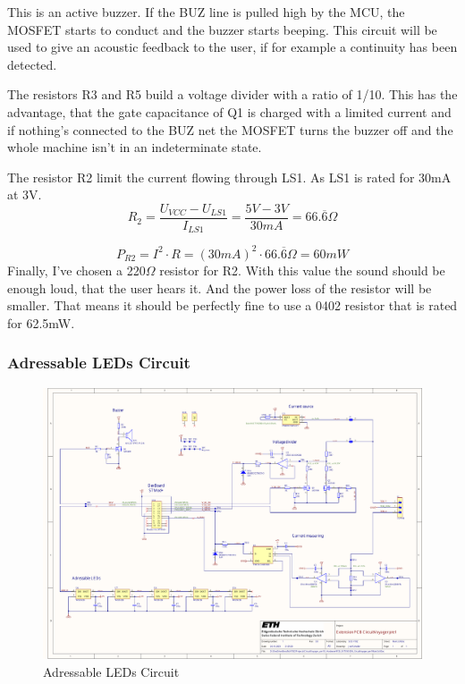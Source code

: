 This is an active buzzer. If the BUZ line is pulled high by the MCU, the MOSFET starts to conduct and the buzzer starts beeping. This circuit will be used to give an acoustic feedback to the user, if for example a continuity has been detected. 

The resistors R3 and R5 build a voltage divider with a ratio of 1/10. This has the advantage, that the gate capacitance of Q1 is charged with a limited current and if nothing's connected to the BUZ net the MOSFET turns the buzzer off and the whole machine isn't  in an indeterminate state.

The resistor R2 limit the current flowing through LS1. As LS1 is rated for 30mA at 3V.
\[R_2=\frac{U_{VCC}-U_{LS1}}{I_{LS1}}=\frac{5V-3V}{30mA}=66.\overline{6}\Omega\]

\[P_{R2}=I^2 \cdot R=(30mA)^2 \cdot 66. \overline{6} \Omega =60mW\]
Finally, I've chosen a 220\(\Omega\) resistor for R2. With this value the sound should be enough loud, that the user hears it. And the power loss of the resistor will be smaller. That means it should be perfectly fine to use a 0402 resistor that is rated for 62.5mW.


\subsubsection{Adressable LEDs Circuit}

\begin{figure}[H]
	\centering
	\includegraphics[width=15cm, trim={1.3cm 4cm 16.3cm 20cm}, clip]{Resources/Pictures/Schematic_PCB_EXTENSION_CircuitVoyager_pre1.pdf}
	\caption{Adressable LEDs Circuit}
	\label{fig:Adressable LEDs Circuit}
\end{figure}

